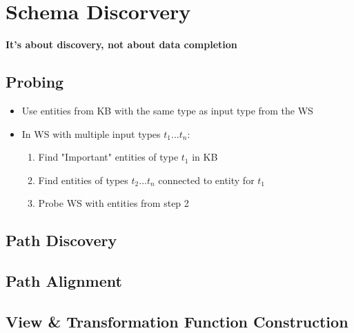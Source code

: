 \documentclass[10pt,a4paper]{article}
\begin{document}
\section*{Schema Discorvery}
\textbf{\Large It's about discovery, not about data completion}
\subsection*{Probing}
\begin{itemize}
	\item Use entities from KB with the same type as input type from the WS
	\item In WS with multiple input types $t_{1}...t_{n}$:
	\begin{enumerate}
		\item Find "Important" entities of type $t_{1}$ in KB
		\item Find entities of types $t_{2}...t_{n}$ connected to entity for $t_{1}$
		\item Probe WS with entities from step 2
	\end{enumerate}
\end{itemize}
\subsection*{Path Discovery}
\subsection*{Path Alignment}
\subsection*{View \& Transformation Function Construction}
	
	
	
\end{document}
